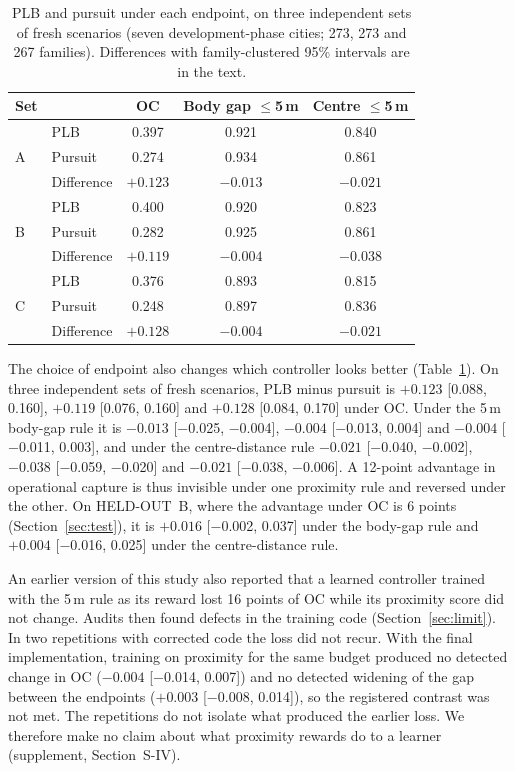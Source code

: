 \documentclass[5p,twocolumn]{elsarticle}
\begin{document}
\begin{table}[!t]
\centering
\caption{PLB and pursuit under each endpoint, on three independent sets of fresh scenarios (seven
development-phase cities; 273, 273 and 267 families). Differences with family-clustered 95\% intervals are in the
text.}
\label{tab:reversal}
\small
\setlength{\tabcolsep}{3pt}
\begin{tabular}{@{}llccc@{}}
\toprule
Set & & OC & Body gap $\le$5\,m & Centre $\le$5\,m \\
\midrule
\multirow{3}{*}{A} & PLB & 0.397 & 0.921 & 0.840 \\
& Pursuit & 0.274 & 0.934 & 0.861 \\
& Difference & $+0.123$ & $-0.013$ & $-0.021$ \\
\midrule
\multirow{3}{*}{B} & PLB & 0.400 & 0.920 & 0.823 \\
& Pursuit & 0.282 & 0.925 & 0.861 \\
& Difference & $+0.119$ & $-0.004$ & $-0.038$ \\
\midrule
\multirow{3}{*}{C} & PLB & 0.376 & 0.893 & 0.815 \\
& Pursuit & 0.248 & 0.897 & 0.836 \\
& Difference & $+0.128$ & $-0.004$ & $-0.021$ \\
\bottomrule
\end{tabular}
\end{table}

The choice of endpoint also changes which controller looks better (Table~\ref{tab:reversal}). On three independent
sets of fresh scenarios, PLB minus pursuit is $+0.123$ [0.088, 0.160], $+0.119$ [0.076, 0.160] and $+0.128$
[0.084, 0.170] under OC. Under the 5\,m body-gap rule it is $-0.013$ [$-$0.025, $-$0.004], $-0.004$
[$-$0.013, 0.004] and $-0.004$ [$-$0.011, 0.003], and under the centre-distance rule $-0.021$ [$-$0.040, $-$0.002],
$-0.038$ [$-$0.059, $-$0.020] and $-0.021$ [$-$0.038, $-$0.006]. A 12-point advantage in operational capture is
thus invisible under one proximity rule and reversed under the other. On HELD-OUT~B, where the advantage under OC is
6 points (Section~\ref{sec:test}), it is $+0.016$ [$-$0.002, 0.037] under the body-gap rule and $+0.004$ [$-$0.016,
0.025] under the centre-distance rule.

An earlier version of this study also reported that a learned controller trained with the 5\,m rule as its reward
lost 16 points of OC while its proximity score did not change. Audits then found defects in the training code
(Section~\ref{sec:limit}). In two repetitions with corrected code the loss did not recur. With the final
implementation, training on proximity for the same budget produced no detected change in OC ($-0.004$
[$-$0.014, 0.007]) and no detected widening of the gap between the endpoints ($+0.003$ [$-$0.008, 0.014]), so the
registered contrast was not met. The repetitions do not isolate what produced the earlier loss. We therefore make no
claim about what proximity rewards do to a learner (supplement, Section~S-IV).
\end{document}
